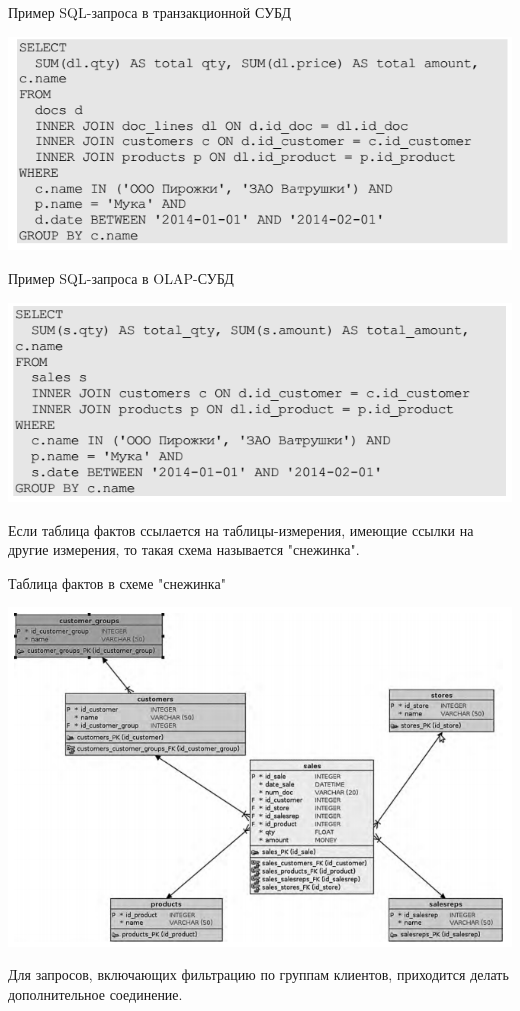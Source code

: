 \begin{frame}
\begin{block}{Пример SQL-запроса в транзакционной СУБД}
\begin{center}
\includegraphics[scale=0.45]{images/sql-trans.png}
\end{center}
\end{block}
\begin{block}{Пример SQL-запроса в OLAP-СУБД}
\begin{center}
\includegraphics[scale=0.45]{images/sql-analitic.png}
\end{center}
\end{block}
\end{frame}

\begin{frame}
Если таблица фактов ссылается на таблицы-измерения, имеющие ссылки на другие измерения, то такая схема называется "снежинка".
\begin{block}{Таблица фактов в схеме "снежинка"}
\begin{center}
\includegraphics[scale=0.45]{images/snow.png}
\end{center}
\end{block}
Для запросов, включающих фильтрацию по группам клиентов, приходится делать дополнительное соединение.
\end{frame}

